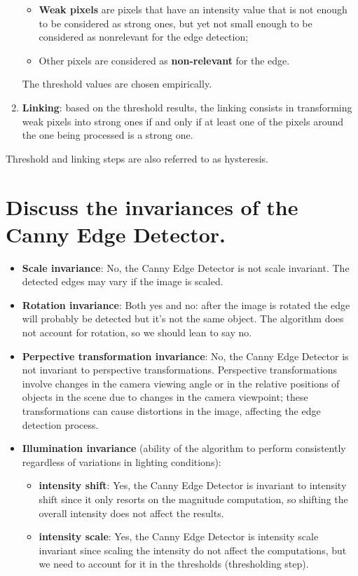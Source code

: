 \documentclass{article}
\begin{document}
\begin{enumerate}[start=0]
\begin{itemize}
        \item \textbf{Weak pixels} are pixels that have an intensity value that is not enough to be considered as strong ones, but yet not small enough to be considered as nonrelevant for the edge detection;
        \item Other pixels are considered as \textbf{non-relevant} for the edge.
    \end{itemize}
    The threshold values are chosen empirically.
    \item \textbf{Linking}: based on the threshold results, the linking consists in transforming weak pixels into strong ones if and only if at least one of the pixels around the one being processed is a strong one.
\end{enumerate}

Threshold and linking steps are also referred to as hysteresis.

\section{Discuss the invariances of the Canny Edge Detector.}

\begin{itemize}
    \item \textbf{Scale invariance}: No, the Canny Edge Detector is not scale invariant. The detected edges may vary if the image is scaled.
    \item \textbf{Rotation invariance}: Both yes and no: after the image is rotated the edge will probably be detected but it's not the same object. The algorithm does not account for rotation, so we should lean to say  no.
    \item \textbf{Perpective transformation invariance}: No, the Canny Edge Detector is not invariant to perspective transformations. Perspective transformations involve changes in the camera viewing angle or in the relative positions of objects in the scene due to changes in the camera viewpoint; these transformations can cause distortions in the image, affecting the edge detection process.
    \item \textbf{Illumination invariance} (ability of the algorithm to perform consistently regardless of variations in lighting conditions):
    \begin{itemize}
        \item \textbf{intensity shift}: Yes, the Canny Edge Detector is invariant to intensity shift since it only resorts on the magnitude computation, so shifting the overall intensity does not affect the results.
        \item \textbf{intensity scale}: Yes, the Canny Edge Detector is intensity scale invariant since scaling the intensity do not affect the computations, but we need to account for it in the thresholds (thresholding step).
    \end{itemize}
\end{itemize}
\end{document}
